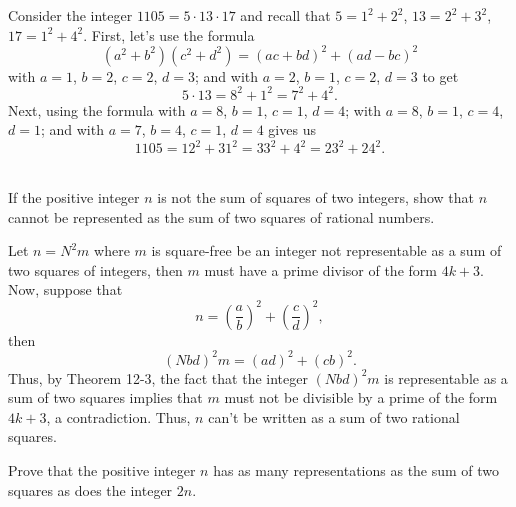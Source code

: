 \begin{solution}
    Consider the integer $1105 = 5 \cdot 13 \cdot 17$ and recall that $5 = 1^2 + 2^2$, $13 = 2^2 + 3^2$, $17 = 1^2 + 4^2$. First, let's use the formula
    $$(a^2 + b^2)(c^2 + d^2) = (ac + bd)^2 + (ad - bc)^2$$
    with $a = 1$, $b = 2$, $c = 2$, $d = 3$; and with $a = 2$, $b = 1$, $c = 2$, $d = 3$ to get
    $$5 \cdot 13 = 8^2 + 1^2 = 7^2 + 4^2.$$
    Next, using the formula with $a = 8$, $b = 1$, $c = 1$, $d = 4$; with $a = 8$, $b = 1$, $c = 4$, $d = 1$; and with $a = 7$, $b = 4$, $c = 1$, $d = 4$ gives us
    $$1105 = 12^2 + 31^2 = 33^2 + 4^2 = 23^2 + 24^2.$$\\
\end{solution}

\begin{exercise}
    If the positive integer $n$ is not the sum of squares of two integers, show that $n$ cannot be represented as the sum of two squares of rational numbers.  \\
\end{exercise}

\begin{solution}
    Let $n = N^2m$ where $m$ is square-free be an integer not representable as a sum of two squares of integers, then $m$ must have a prime divisor of the form $4k+3$. Now, suppose that
    $$n = \left(\frac{a}{b}\right)^2 + \left(\frac{c}{d}\right)^2,$$
    then
    $$(Nbd)^2m = (ad)^2 + (cb)^2.$$
    Thus, by Theorem 12-3, the fact that the integer $(Nbd)^2m$ is representable as a sum of two squares implies that $m$ must not be divisible by a prime of the form $4k+3$, a contradiction. Thus, $n$ can't be written as a sum of two rational squares.  \\
\end{solution}

\begin{exercise}
    Prove that the positive integer $n$ has as many representations as the sum of two squares as does the integer $2n$.  \\
\end{exercise}

